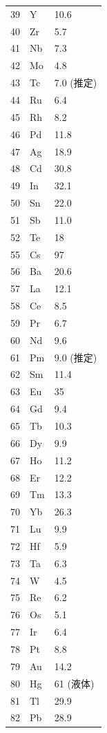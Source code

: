 \documentclass[11pt,a4paper]{article}
\theoremstyle{remark}
\begin{document}
\begin{longtable}{p{0.6cm}p{1.2cm}p{1.5cm}}
		39 & Y  & 10.6 \\
		40 & Zr & 5.7 \\
		41 & Nb & 7.3 \\
		42 & Mo & 4.8 \\
		43 & Tc & 7.0 (推定) \\
		44 & Ru & 6.4 \\
		45 & Rh & 8.2 \\
		46 & Pd & 11.8 \\
		47 & Ag & 18.9 \\
		48 & Cd & 30.8 \\
		49 & In & 32.1 \\
		50 & Sn & 22.0 \\
		51 & Sb & 11.0 \\
		52 & Te & 18 \\
		55 & Cs & 97 \\
		56 & Ba & 20.6 \\
		57 & La & 12.1 \\
		58 & Ce & 8.5 \\
		59 & Pr & 6.7 \\
		60 & Nd & 9.6 \\
		61 & Pm & 9.0 (推定) \\
		62 & Sm & 11.4 \\
		63 & Eu & 35 \\
		64 & Gd & 9.4 \\
		65 & Tb & 10.3 \\
		66 & Dy & 9.9 \\
		67 & Ho & 11.2 \\
		68 & Er & 12.2 \\
		69 & Tm & 13.3 \\
		70 & Yb & 26.3 \\
		71 & Lu & 9.9 \\
		72 & Hf & 5.9 \\
		73 & Ta & 6.3 \\
		74 & W  & 4.5 \\
		75 & Re & 6.2 \\
		76 & Os & 5.1 \\
		77 & Ir & 6.4 \\
		78 & Pt & 8.8 \\
		79 & Au & 14.2 \\
		80 & Hg & 61 (液体) \\
		81 & Tl & 29.9 \\
		82 & Pb & 28.9 \\
	\end{longtable}
	
\end{document}
